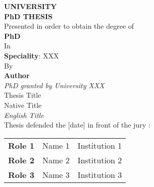 \documentclass[11pt,fleqn,openany]{book} %
\begin{document}

\dominitoc
\doparttoc


\begin{titlepage}
    \begin{center}
        {\Huge\textbf{UNIVERSITY}} \\
        \vspace{0.5cm}
        \Large\textbf{PhD THESIS} \\
        \vspace{0.5cm}
        \large{Presented in order to obtain the degree of} \\
        \vspace{0.5cm}
        \Huge\textbf{PhD} \\
        \vspace{0.5cm}
        \Large{In} \\
        \vspace{0.5cm}
        \large{\textbf{Speciality}: XXX} \\
        \vspace{0.5cm}
        \Large{By} \\
        \vspace{0.5cm}
        \Huge\textbf{Author} \\
        \vspace{0.5cm}
        \large{\textit{PhD granted by University XXX}} \\
        \vspace{0.5cm}
        \large{Thesis Title} \\
        \vspace{0.1cm}
        \Large{Native Title} \\
        \vspace{0.1cm}
        \Large{\textit{English Title}} \\
        \vspace{0.4cm}
        \large{Thesis defended the [date] in front of the jury :} \\
        \vspace{0.5cm}
        \hspace*{0.2cm}
        \begin{tabular}{lll}
            \large{\textbf{Role 1}} & \large{Name 1} & Institution 1\\
            \large{\textbf{Role 2}} & \large{Name 2} & Institution 2\\
            \large{\textbf{Role 3}} & \large{Name 3} & Institution 3\\

\end{tabular}
\end{center}
\end{titlepage}
\end{document}
